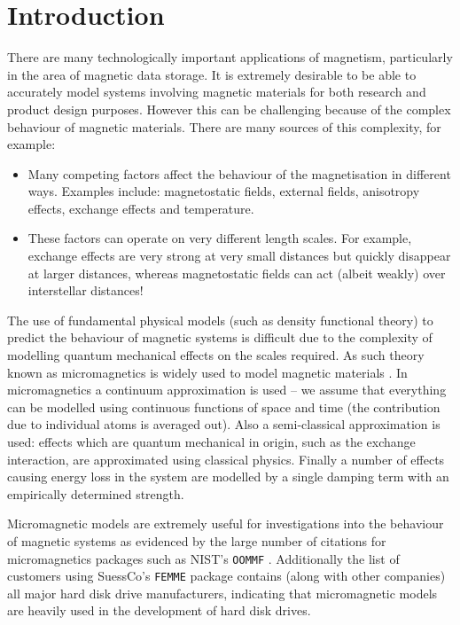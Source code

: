 
\chapter{Introduction}
\label{sec:introduction}

There are many technologically important applications of magnetism, particularly in the area of magnetic data storage.
It is extremely desirable to be able to accurately model systems involving magnetic materials for both research and product design purposes.
However this can be challenging because of the complex behaviour of magnetic materials.
There are many sources of this complexity, for example:
\begin{itemize}
\item Many competing factors affect the behaviour of the magnetisation in different ways. Examples include: magnetostatic fields, external fields, anisotropy effects, exchange effects and temperature.

\item These factors can operate on very different length scales.
  For example, exchange effects are very strong at very small distances but quickly disappear at larger distances, whereas magnetostatic fields can act (albeit weakly) over interstellar distances!
\end{itemize}

The use of fundamental physical models (such as density functional theory) to predict the behaviour of magnetic systems is difficult due to the complexity of modelling quantum mechanical effects on the scales required.
As such theory known as micromagnetics is widely used to model magnetic materials \cite{Coey2010} \cite{Kronmuller2003}.
In micromagnetics a continuum approximation is used -- we assume that everything can be modelled using continuous functions of space and time (the contribution due to individual atoms is averaged out).
Also a semi-classical approximation is used: effects which are quantum mechanical in origin, such as the exchange interaction, are approximated using classical physics.
Finally a number of effects causing energy loss in the system are modelled by a single damping term with an empirically determined strength.

Micromagnetic models are extremely useful for investigations into the behaviour of magnetic systems as evidenced by the large number of citations for micromagnetics packages such as NIST's \texttt{OOMMF} \cite{oommf-website}.
Additionally the list of customers using SuessCo's \texttt{FEMME} package \cite{suessco-website} contains (along with other companies) all major hard disk drive manufacturers, indicating that micromagnetic models are heavily used in the development of hard disk drives.

